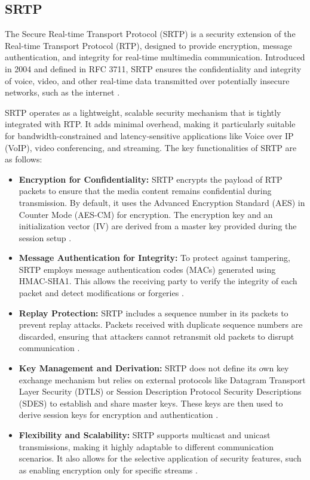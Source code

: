 \documentclass[conference]{IEEEtran}
\begin{document}
\subsection{SRTP}
The Secure Real-time Transport Protocol (SRTP) is a security extension of the Real-time Transport Protocol (RTP), 
designed to provide encryption, message authentication, and integrity for real-time multimedia communication. 
Introduced in 2004 and defined in RFC 3711, SRTP ensures the confidentiality and integrity of voice, video, and 
other real-time data transmitted over potentially insecure networks, such as the internet \cite{RFC3711}. 

SRTP operates as a lightweight, scalable security mechanism that is tightly integrated with RTP. It adds minimal overhead, 
making it particularly suitable for bandwidth-constrained and latency-sensitive applications like Voice over IP (VoIP), video 
conferencing, and streaming. The key functionalities of SRTP are as follows:
\begin{itemize}
    \item \textbf{Encryption for Confidentiality:} SRTP encrypts the payload of RTP packets to ensure that the media content remains 
    confidential during transmission. By default, it uses the Advanced Encryption Standard (AES) in Counter Mode (AES-CM) for encryption. 
    The encryption key and an initialization vector (IV) are derived from a master key provided during the session setup \cite{RFC3711}.
    \item \textbf{Message Authentication for Integrity:} To protect against tampering, SRTP employs message authentication codes (MACs) 
    generated using HMAC-SHA1. This allows the receiving party to verify the integrity of each packet and detect modifications or forgeries \cite{RFC3711}.
    \item \textbf{Replay Protection:} SRTP includes a sequence number in its packets to prevent replay attacks. Packets received with 
    duplicate sequence numbers are discarded, ensuring that attackers cannot retransmit old packets to disrupt communication \cite{RFC3711}.
    \item \textbf{Key Management and Derivation:} SRTP does not define its own key exchange mechanism but relies on external protocols 
    like Datagram Transport Layer Security (DTLS) or Session Description Protocol Security Descriptions (SDES) to establish and share master keys. 
    These keys are then used to derive session keys for encryption and authentication \cite{RFC3711}.
    \item \textbf{Flexibility and Scalability:} SRTP supports multicast and unicast transmissions, making it highly adaptable to different 
    communication scenarios. It also allows for the selective application of security features, such as enabling encryption only for specific streams \cite{RFC3711}.
\end{itemize}
\end{document}

